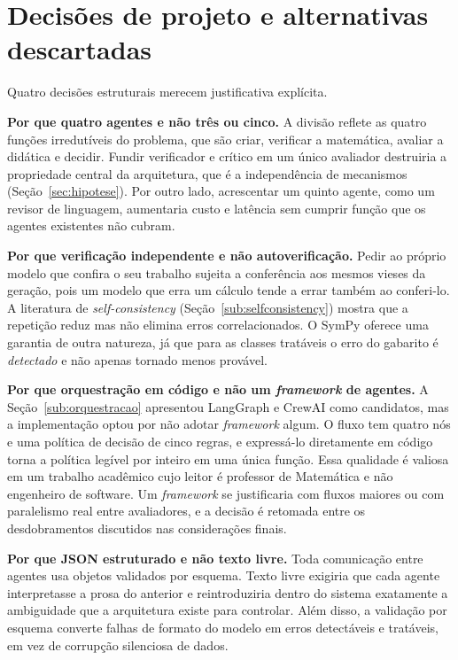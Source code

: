 \section{Decisões de projeto e alternativas descartadas}
\label{sec:decisoes}

Quatro decisões estruturais merecem justificativa explícita.

\textbf{Por que quatro agentes e não três ou cinco.} A divisão reflete as quatro funções
irredutíveis do problema, que são criar, verificar a matemática, avaliar a didática e decidir.
Fundir verificador e crítico em um único avaliador destruiria a propriedade central da arquitetura,
que é a independência de mecanismos (Seção~\ref{sec:hipotese}). Por outro lado, acrescentar um
quinto agente, como um revisor de linguagem, aumentaria custo e latência sem cumprir função que os
agentes existentes não cubram.

\textbf{Por que verificação independente e não autoverificação.} Pedir ao próprio modelo que
confira o seu trabalho sujeita a conferência aos mesmos vieses da geração, pois um modelo que erra
um cálculo tende a errar também ao conferi-lo. A literatura de \emph{self-consistency}
(Seção~\ref{sub:selfconsistency}) mostra que a repetição reduz mas não elimina erros
correlacionados. O SymPy oferece uma garantia de outra natureza, já que para as classes tratáveis o
erro do gabarito é \emph{detectado} e não apenas tornado menos provável.

\textbf{Por que orquestração em código e não um \emph{framework} de agentes.} A
Seção~\ref{sub:orquestracao} apresentou LangGraph e CrewAI como candidatos, mas a implementação
optou por não adotar \emph{framework} algum. O fluxo tem quatro nós e uma política de decisão de
cinco regras, e expressá-lo diretamente em código torna a política legível por inteiro em uma única
função. Essa qualidade é valiosa em um trabalho acadêmico cujo leitor é professor de Matemática e
não engenheiro de software. Um \emph{framework} se justificaria com fluxos maiores ou com
paralelismo real entre avaliadores, e a decisão é retomada entre os desdobramentos discutidos nas
considerações finais.

\textbf{Por que JSON estruturado e não texto livre.} Toda comunicação entre agentes usa objetos
validados por esquema. Texto livre exigiria que cada agente interpretasse a prosa do anterior e
reintroduziria dentro do sistema exatamente a ambiguidade que a arquitetura existe para controlar.
Além disso, a validação por esquema converte falhas de formato do modelo em erros detectáveis e
tratáveis, em vez de corrupção silenciosa de dados.

